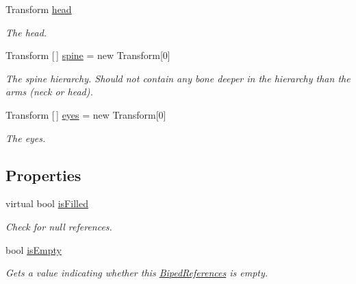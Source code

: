 \begin{DoxyCompactItemize}
Transform \mbox{\hyperlink{class_root_motion_1_1_biped_references_a0934fcbdbdb9d80099bd014a134319e0}{head}}
\begin{DoxyCompactList}\small\item\em The head. \end{DoxyCompactList}\item 
Transform \mbox{[}$\,$\mbox{]} \mbox{\hyperlink{class_root_motion_1_1_biped_references_aac4acc4a14c2ea6f05693afd5ff57c2c}{spine}} = new Transform\mbox{[}0\mbox{]}
\begin{DoxyCompactList}\small\item\em The spine hierarchy. Should not contain any bone deeper in the hierarchy than the arms (neck or head). \end{DoxyCompactList}\item 
Transform \mbox{[}$\,$\mbox{]} \mbox{\hyperlink{class_root_motion_1_1_biped_references_ad5c4f83e5e5425de0c2fdca68a4ea731}{eyes}} = new Transform\mbox{[}0\mbox{]}
\begin{DoxyCompactList}\small\item\em The eyes. \end{DoxyCompactList}\end{DoxyCompactItemize}
\subsection*{Properties}
\begin{DoxyCompactItemize}
\item 
virtual bool \mbox{\hyperlink{class_root_motion_1_1_biped_references_a6520a3b816d79d54b2057ce1a5d04516}{is\+Filled}}
\begin{DoxyCompactList}\small\item\em Check for null references. \end{DoxyCompactList}\item 
bool \mbox{\hyperlink{class_root_motion_1_1_biped_references_a300b9269aec71669fc38fb9b349cc075}{is\+Empty}}
\begin{DoxyCompactList}\small\item\em Gets a value indicating whether this \mbox{\hyperlink{class_root_motion_1_1_biped_references}{Biped\+References}} is empty. \end{DoxyCompactList}\end{DoxyCompactItemize}


